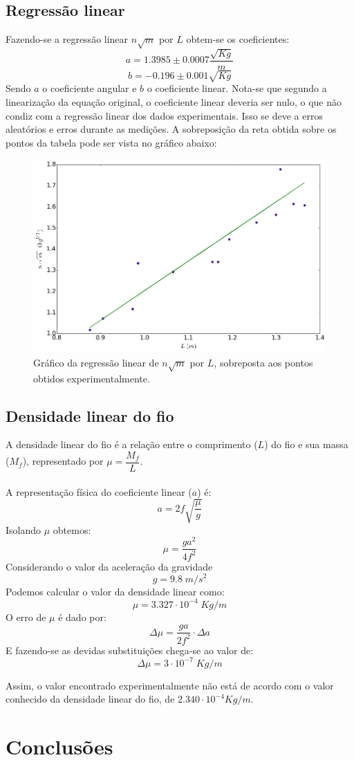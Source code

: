 \documentclass[12pt,a4paper]{article}
\begin{document}
\subsection{Regressão linear}
Fazendo-se a regressão linear $n\sqrt{m}$ por $L$ obtem-se os coeficientes:
$$a = 1.3985 \pm 0.0007 \dfrac{\sqrt{Kg}}{m}$$
$$b = -0.196 \pm 0.001 \sqrt{Kg}$$
Sendo $a$ o coeficiente angular e $b$ o coeficiente linear.
Nota-se que segundo a linearização da equação original, o coeficiente linear deveria ser nulo, o que não condiz com a regressão linear dos dados experimentais. Isso se deve a erros aleatórios e erros durante as medições.
A sobreposição da reta obtida sobre os pontos da tabela pode ser vista no gráfico abaixo:

\begin{figure} [!htbp]

\includegraphics[scale=0.6]{graf1.png}
\caption{Gráfico da regressão linear de $n\sqrt{m}$ por $L$, sobreposta aos pontos obtidos experimentalmente.}

\end{figure}
\subsection{Densidade linear do fio}
A densidade linear do fio é a relação entre o comprimento ($L$) do fio e sua massa ($M_f$), representado por $\mu = \dfrac{M_f}{L}$.\\\\
A representação física do coeficiente linear ($a$) é:
$$a = 2f \sqrt{\dfrac{\mu}{g}}$$
Isolando $\mu$ obtemos:
$$ \mu = \dfrac{ga^2}{4f^2} $$
Considerando o valor da aceleração da gravidade 
$$g = 9.8 \; m/s^2 $$
Podemos calcular o valor da densidade linear como:
$$ \mu = 3.327 \cdot 10^{-4} \; Kg/m$$
O erro de $\mu$ é dado por:
$$ \Delta \mu = \dfrac{ga}{2f^2} \cdot \Delta a$$
E fazendo-se as devidas substituições chega-se ao valor de:
$$\Delta \mu = 3 \cdot 10^{-7} \; Kg/m$$

Assim, o valor encontrado experimentalmente não está de acordo com o valor conhecido da densidade linear do fio, de $2.340 \cdot 10^{-4} Kg/m$.


\section{Conclusões}


\begin{thebibliography}{9}


\end{thebibliography}
\end{document}
